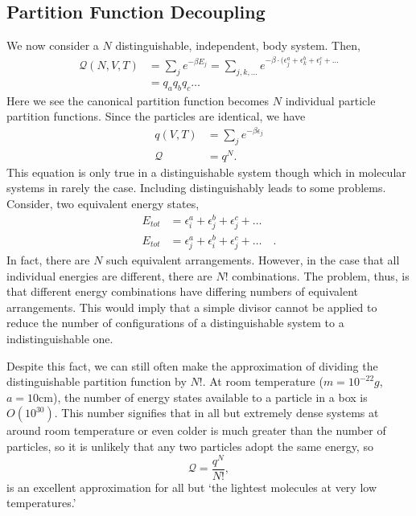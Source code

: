 \subsection{Partition Function Decoupling}
We now consider a $N$ distinguishable, independent, body system. Then,
\begin{align*}
	\mathcal{Q}(N,V,T) &= \sum_j{e^{-\beta E_j}} = \sum_{j,k,\dots}{e^{-\beta
	\cdot (\epsilon_j^a + \epsilon_k^b + \epsilon_l^c + \dots}} \\
					   &= q_a q_b q_c \dots
\end{align*}
Here we see the canonical partition function becomes $N$ individual particle
partition functions. Since the particles are identical, we have
\begin{align*}
	q(V, T) &= \sum_j{e^{-\beta \epsilon_j}}\\
	\mathcal{Q} &= q^{N}. 
\end{align*}
This equation is only true in a distinguishable system though which in molecular
systems in rarely the case. Including distinguishably leads to some problems.
Consider, two equivalent energy states,
\begin{align*}
	E_{tot} &= \epsilon_i^a + \epsilon_j^b + \epsilon_j^c + \dots \\
	E_{tot} &= \epsilon_j^a + \epsilon_i^b + \epsilon_j^c + \dots\quad .
\end{align*}
In fact, there are $N$ such equivalent arrangements. However, in the case that
all individual energies are different, there are $N!$ combinations. The problem,
thus, is that different energy combinations have differing numbers of equivalent
arrangements. This would imply that a simple divisor cannot be applied to reduce
the number of configurations of a distinguishable system to a indistinguishable
one.

Despite this fact, we can still often make the approximation of dividing the
distinguishable partition function by $N!$. At room temperature ($m=10^{-22}g$,
$a=10\text{cm}$), the number of energy states available to a particle in a box
is $O(10^{30})$. This number signifies that in all but extremely dense systems
at around room temperature or even colder is much greater than the number of
particles, so it is unlikely that any two particles adopt the same energy, so
\begin{equation*}
	\mathcal{Q} = \frac{q^{N}}{N!},
\end{equation*}
is an excellent approximation for all but `the lightest molecules at very low
temperatures.'
